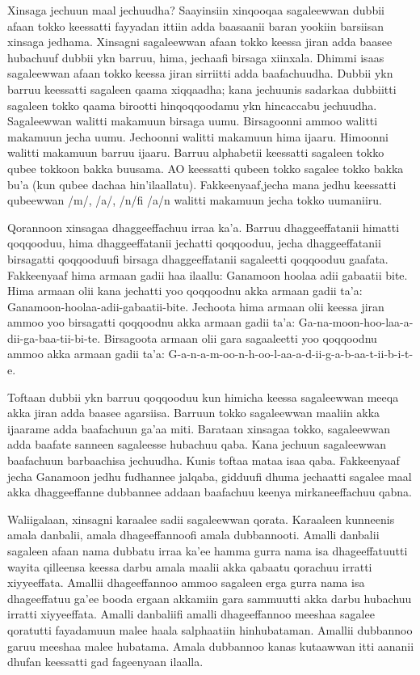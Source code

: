 \documentclass[11pt,b5paper]{book}
\begin{document}
Xinsaga jechuun maal jechuudha? Saayinsiin xinqooqaa sagaleewwan dubbii afaan tokko keessatti fayyadan ittiin adda baasaanii baran yookiin barsiisan xinsaga jedhama. Xinsagni sagaleewwan afaan tokko keessa jiran adda baasee hubachuuf dubbii ykn barruu, hima, jechaafi birsaga xiinxala. Dhimmi isaas sagaleewwan afaan tokko keessa jiran sirriitti adda baafachuudha. Dubbii ykn barruu keessatti sagaleen qaama xiqqaadha; kana jechuunis sadarkaa dubbiitti sagaleen tokko qaama birootti hinqoqqoodamu ykn hincaccabu jechuudha. Sagaleewwan walitti makamuun birsaga uumu. Birsagoonni ammoo walitti makamuun jecha uumu. Jechoonni walitti makamuun hima ijaaru. Himoonni walitti makamuun barruu ijaaru. Barruu alphabetii keessatti sagaleen tokko qubee tokkoon bakka buusama. AO keessatti qubeen tokko sagalee tokko bakka bu’a (kun qubee dachaa hin’ilaallatu). Fakkeenyaaf,jecha mana jedhu keessatti qubeewwan /m/, /a/, /n/fi /a/n walitti makamuun jecha tokko uumaniiru.

Qorannoon xinsagaa dhaggeeffachuu irraa ka’a. Barruu dhaggeeffatanii himatti qoqqooduu, hima dhaggeeffatanii jechatti qoqqooduu, jecha dhaggeeffatanii birsagatti qoqqooduufi birsaga dhaggeeffatanii sagaleetti qoqqooduu gaafata. Fakkeenyaaf hima armaan gadii haa ilaallu:
Ganamoon hoolaa adii gabaatii bite.
Hima armaan olii kana jechatti yoo qoqqoodnu akka armaan gadii ta’a:
Ganamoon-hoolaa-adii-gabaatii-bite.
Jechoota hima armaan olii keessa jiran ammoo yoo birsagatti
qoqqoodnu akka armaan gadii ta’a:
Ga-na-moon-hoo-laa-a-dii-ga-baa-tii-bi-te.
Birsagoota armaan olii gara sagaaleetti yoo qoqqoodnu ammoo akka armaan gadii ta’a:
G-a-n-a-m-oo-n-h-oo-l-aa-a-d-ii-g-a-b-aa-t-ii-b-i-t-e.

Toftaan dubbii ykn barruu qoqqooduu kun himicha keessa sagaleewwan meeqa akka jiran adda baasee agarsiisa. Barruun tokko sagaleewwan maaliin akka ijaarame adda baafachuun
ga’aa miti. Barataan xinsagaa tokko, sagaleewwan adda baafate sanneen sagaleesse hubachuu qaba. Kana jechuun sagaleewwan baafachuun barbaachisa jechuudha. Kunis toftaa mataa isaa
qaba. Fakkeenyaaf jecha Ganamoon jedhu fudhannee jalqaba, gidduufi dhuma jechaatti sagalee maal akka dhaggeeffanne dubbannee addaan baafachuu keenya mirkaneeffachuu qabna.

Waliigalaan, xinsagni karaalee sadii sagaleewwan qorata. Karaaleen kunneenis amala danbalii, amala dhageeffannoofi amala dubbannooti. Amalli danbalii sagaleen afaan nama dubbatu irraa ka'ee hamma gurra nama isa dhageeffatuutti wayita qilleensa keessa darbu amala maalii akka qabaatu qorachuu irratti xiyyeeffata. Amallii dhageeffannoo ammoo sagaleen erga gurra nama isa
dhageeffatuu ga’ee booda ergaan akkamiin gara sammuutti akka darbu hubachuu irratti xiyyeeffata. Amalli danbaliifi amalli dhageeffannoo meeshaa sagalee qoratutti fayadamuun
malee haala salphaatiin hinhubataman. Amallii dubbannoo garuu meeshaa malee hubatama. Amala dubbannoo kanas kutaawwan itti aananii dhufan keessatti gad fageenyaan ilaalla.
\end{document}
